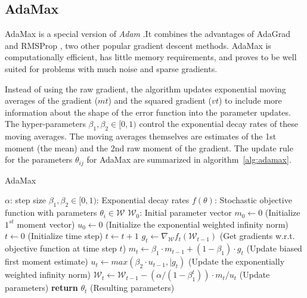 \subsection{AdaMax}
AdaMax is a special version 
of \textit{Adam} \cite{kingma2014adam}.It combines the advantages of AdaGrad \cite{duchi2011adaptive} and RMSProp \cite{bengio2015rmsprop},
two other popular gradient descent methods. AdaMax is computationally efficient, has little
memory requirements, and proves to be well suited for problems with much noise and sparse gradients.

Instead of using the raw gradient, the algorithm updates exponential moving averages of the gradient ($mt$) and the squared gradient
($vt$) to include more information about the shape of the error function into the parameter updates. The hyper-parameters $\beta_1, \beta_2 \in [0, 1)$ control the exponential decay rates of these moving
averages. The moving averages themselves are estimates of the 1st moment (the mean) and the
2nd raw moment of the gradient. The update rule for the parameters $\theta_{ij}$ for AdaMax are summarized in 
algorithm~\ref{alg:adamax}.

\begin{algorithm}
    \caption{AdaMax}
    \begin{algorithmic}[1]
        \Require $\alpha$: step size
        \Require $\beta_1, \beta_2 \in [0,1)$: Exponential decay rates
        \Require $f(\theta)$: Stochastic objective function with parameters $\theta_i \in \mathcal{W}$
        \Require $\mathcal{W}_0$: Initial parameter vector
        \State $m_0 \gets 0$ (Initialize $1^{st}$ moment vector)
        \State $u_0 \gets 0$ (Initialize the exponential weighted infinity norm)
        \State $t \gets 0$ (Initialize time step)
            \State $t\gets t+1$
            \State $g_t \gets \nabla_{\mathcal{W}}f_t(\mathcal{W}_{t-1})$ (Get gradients w.r.t. objective function at time step $t$)
            \State $m_t \gets \beta_1 \cdot m_{t-1} + (1-\beta_1) \cdot g_t$ (Update biased first moment estimate)
            \State $u_t \gets max(\beta_2 \cdot u_{t-1}, \vert{g_t})$ (Update the exponentially weighted infinity norm)
            \State $\mathcal{W}_t \gets \mathcal{W}_{t-1} - (\alpha/ (1-\beta_1^t)) \cdot m_t/u_t$ (Update parameters)
        \EndWhile
        \State \textbf{return} $\theta_t$ (Resulting parameters)
    \end{algorithmic}
    \label{alg:adamax}
\end{algorithm}

